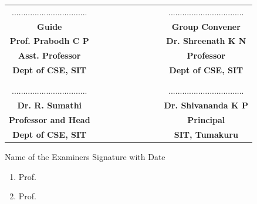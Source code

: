 \begin{table}[h!]
\centering
\begin{tabular}{cccccccccc}
.................................&&&&&&&&& .................................\\
\textbf{{\footnotesize Guide}} &&&&&&&&&\textbf{{\footnotesize Group Convener}}\\
\textbf{Prof. Prabodh C P}&&&&&&&&& \textbf{Dr. Shreenath K N} \\
\textbf{{\footnotesize Asst. Professor}} &&&&&&&&& \textbf{{\footnotesize Professor}}\\
\textbf{{\footnotesize Dept of CSE, SIT}} &&&&&&&&& \textbf{{\footnotesize Dept of CSE, SIT}}\\
\\
\\
.................................&&&&&&&&& .................................\\
\textbf{Dr. R. Sumathi} &&&&&&&&&  \textbf{Dr. Shivananda K P} \\ 
\textbf{{\footnotesize Professor and Head}} &&&&&&&&&  \textbf{{\footnotesize Principal}} \\
\textbf{{\footnotesize Dept of CSE, SIT}} &&&&&&&&&  \textbf{{\footnotesize SIT, Tumakuru}}\\

\end{tabular} 

\end{table}
Name of the Examiners	\hfill	Signature with Date
\begin{enumerate}
\item Prof.
\item Prof.
\end{enumerate}


